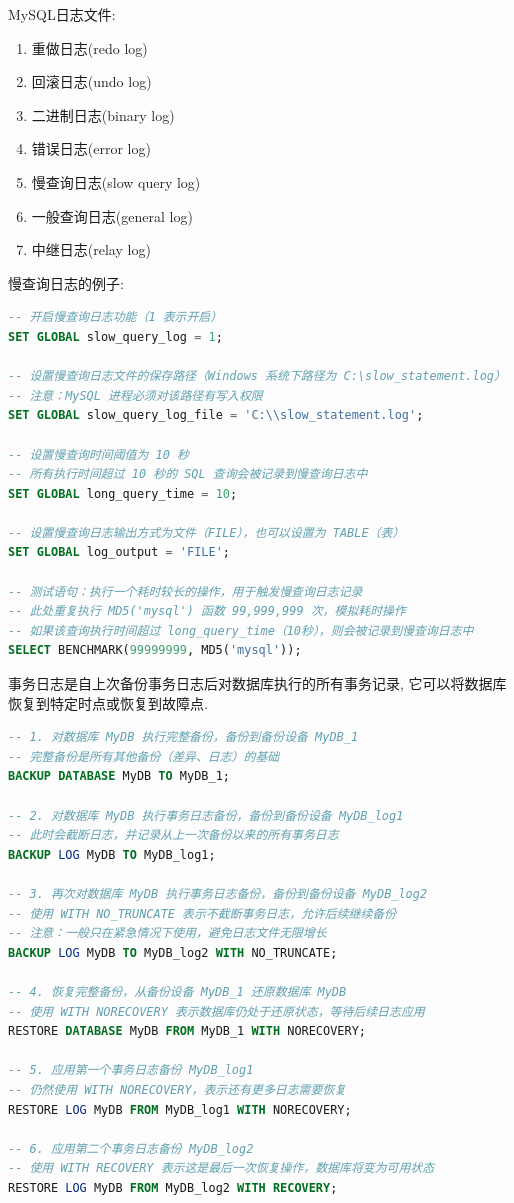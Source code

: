 MySQL日志文件:
\begin{enumerate}
    \item 重做日志(redo log)
    \item 回滚日志(undo log)
    \item 二进制日志(binary log)
    \item 错误日志(error log)
    \item 慢查询日志(slow query log)
    \item 一般查询日志(general log)
    \item 中继日志(relay log)
\end{enumerate}

慢查询日志的例子:
\begin{lstlisting}[language=sql]
-- 开启慢查询日志功能（1 表示开启）
SET GLOBAL slow_query_log = 1;

-- 设置慢查询日志文件的保存路径（Windows 系统下路径为 C:\slow_statement.log）
-- 注意：MySQL 进程必须对该路径有写入权限
SET GLOBAL slow_query_log_file = 'C:\\slow_statement.log';

-- 设置慢查询时间阈值为 10 秒
-- 所有执行时间超过 10 秒的 SQL 查询会被记录到慢查询日志中
SET GLOBAL long_query_time = 10;

-- 设置慢查询日志输出方式为文件（FILE），也可以设置为 TABLE（表）
SET GLOBAL log_output = 'FILE';

-- 测试语句：执行一个耗时较长的操作，用于触发慢查询日志记录
-- 此处重复执行 MD5('mysql') 函数 99,999,999 次，模拟耗时操作
-- 如果该查询执行时间超过 long_query_time（10秒），则会被记录到慢查询日志中
SELECT BENCHMARK(99999999, MD5('mysql'));
\end{lstlisting}

事务日志是自上次备份事务日志后对数据库执行的所有事务记录, 它可以将数据库恢复到特定时点或恢复到故障点.
\begin{lstlisting}[language=sql]
-- 1. 对数据库 MyDB 执行完整备份，备份到备份设备 MyDB_1
-- 完整备份是所有其他备份（差异、日志）的基础
BACKUP DATABASE MyDB TO MyDB_1;

-- 2. 对数据库 MyDB 执行事务日志备份，备份到备份设备 MyDB_log1
-- 此时会截断日志，并记录从上一次备份以来的所有事务日志
BACKUP LOG MyDB TO MyDB_log1;

-- 3. 再次对数据库 MyDB 执行事务日志备份，备份到备份设备 MyDB_log2
-- 使用 WITH NO_TRUNCATE 表示不截断事务日志，允许后续继续备份
-- 注意：一般只在紧急情况下使用，避免日志文件无限增长
BACKUP LOG MyDB TO MyDB_log2 WITH NO_TRUNCATE;

-- 4. 恢复完整备份，从备份设备 MyDB_1 还原数据库 MyDB
-- 使用 WITH NORECOVERY 表示数据库仍处于还原状态，等待后续日志应用
RESTORE DATABASE MyDB FROM MyDB_1 WITH NORECOVERY;

-- 5. 应用第一个事务日志备份 MyDB_log1
-- 仍然使用 WITH NORECOVERY，表示还有更多日志需要恢复
RESTORE LOG MyDB FROM MyDB_log1 WITH NORECOVERY;

-- 6. 应用第二个事务日志备份 MyDB_log2
-- 使用 WITH RECOVERY 表示这是最后一次恢复操作，数据库将变为可用状态
RESTORE LOG MyDB FROM MyDB_log2 WITH RECOVERY;
\end{lstlisting}


